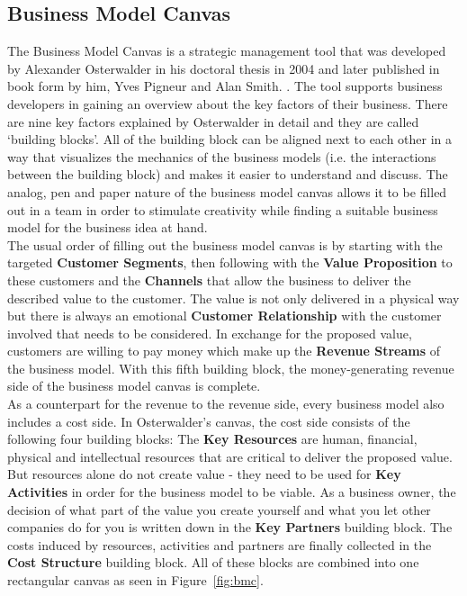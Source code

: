 	\subsection{Business Model Canvas} 
	\label{sec:bmc}
	\vspace{-1em}
		The Business Model Canvas is a strategic management tool that was developed by Alexander Osterwalder in his doctoral thesis in 2004 and later published in book form by him, Yves Pigneur and Alan Smith. \cite{osterwalder}. The tool supports business developers in gaining an overview about the key factors of their business. There are nine key factors explained by Osterwalder in detail and they are called `building blocks'. All of the building block can be aligned next to each other in a way that visualizes the mechanics of the business models (i.e. the interactions between the building block) and makes it easier to understand and discuss. The analog, pen and paper nature of the business model canvas allows it to be filled out in a team in order to stimulate creativity while finding a suitable business model for the business idea at hand.\\
		The usual order of filling out the business model canvas \cite[video]{bmc} is by starting with the targeted \textbf{Customer Segments}, then following with the \textbf{Value Proposition} to these customers and the \textbf{Channels} that allow the business to deliver the described value to the customer. The value is not only delivered in a physical way but there is always an emotional \textbf{Customer Relationship} with the customer involved that needs to be considered. In exchange for the proposed value, customers are willing to pay money which make up the \textbf{Revenue Streams} of the business model. With this fifth building block, the money-generating revenue side of the business model canvas is complete.\\
		As a counterpart for the revenue to the revenue side, every business model also includes a cost side. In Osterwalder's canvas, the cost side consists of the following four building blocks: The \textbf{Key Resources} are human, financial, physical and intellectual resources that are critical to deliver the proposed value. But resources alone do not create value - they need to be used for \textbf{Key Activities} in order for the business model to be viable. As a business owner, the decision of what part of the value you create yourself and what you let other companies do for you is written down in the \textbf{Key Partners} building block. The costs induced by resources, activities and partners are finally collected in the \textbf{Cost Structure} building block. All of these blocks are combined into one rectangular canvas as seen in Figure~\ref{fig:bmc}.

